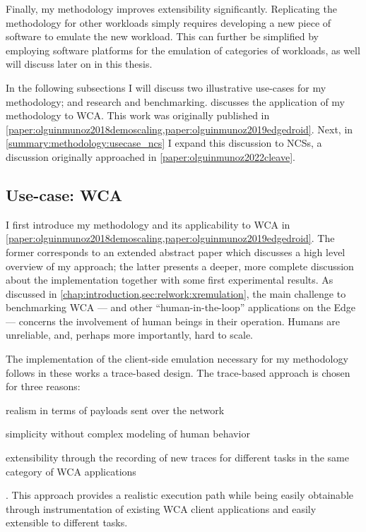 Finally, my methodology improves extensibility significantly.
Replicating the methodology for other workloads simply requires developing a new piece of software to emulate the new workload.
This can further be simplified by employing software platforms for the emulation of categories of workloads, as well will discuss later on in this thesis.

\medskip
In the following subsections I will discuss two illustrative use-cases for my methodology;  and  research and benchmarking.
 discusses the application of my methodology to \gls{WCA}.
This work was originally published in \cref{paper:olguinmunoz2018demoscaling,paper:olguinmunoz2019edgedroid}.
Next, in \cref{summary:methodology:usecase_ncs} I expand this discussion to \glspl{NCS}, a discussion originally approached in \cref{paper:olguinmunoz2022cleave}.

\subsection{Use-case: \acl{WCA}}\label{summary:methodology:usecase_wca}

I first introduce my methodology and its applicability to \gls{WCA} in \cref{paper:olguinmunoz2018demoscaling,paper:olguinmunoz2019edgedroid}.
The former corresponds to an extended abstract paper which discusses a high level overview of my approach;
the latter presents a deeper, more complete discussion about the implementation together with some first experimental results.
As discussed in \cref{chap:introduction,sec:relwork:xremulation}, the main challenge to benchmarking \gls{WCA} --- and other ``human-in-the-loop'' applications on the Edge --- concerns the involvement of human beings in their operation.
Humans are unreliable, and, perhaps more importantly, hard to scale.

The implementation of the client-side emulation necessary for my methodology follows in these works a trace-based design.
The trace-based approach is chosen for three reasons:
\begin{inlineenum}
    \item realism in terms of payloads sent over the network
    \item simplicity without complex modeling of human behavior
    \item extensibility through the recording of new traces for different tasks in the same category of WCA applications
\end{inlineenum}.
This approach provides a realistic execution path while being easily obtainable through instrumentation of existing WCA client applications and easily extensible to different tasks.

